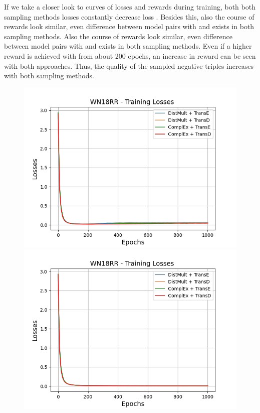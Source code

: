 If we take a closer look to curves of losses and rewards during training, both both sampling methods losses constantly decrease loss .
Besides this, also the course of rewards look similar, even difference between model pairs with \transe and \transd exists in both sampling methods.
Also the course of rewards look similar, even difference between model pairs with \transe and \transd exists in both sampling methods.
Even if a higher reward is achieved with \origsampling from about 200 epochs, an increase in reward can be seen with both approaches.
Thus, the quality of the sampled negative triples increases with both sampling methods.
\clearpage
\begin{figure}[H]
    \centering
    \begin{minipage}{.5\textwidth}
      \centering
      \includegraphics[width=0.9\linewidth]{figures/results/gan_train/not_pretrained/random/wn18rr/epochs1000/random_wn18rr_losses.png}
    \end{minipage}%
    \begin{minipage}{.5\textwidth}
      \centering
      \includegraphics[width=0.9\linewidth]{figures/results/gan_train/not_pretrained/uncertainty/max_distribution/entropy/wn18rr/1k_epochs/uncertainty_wn18rr_losses.png}

\end{minipage}
\end{figure}

